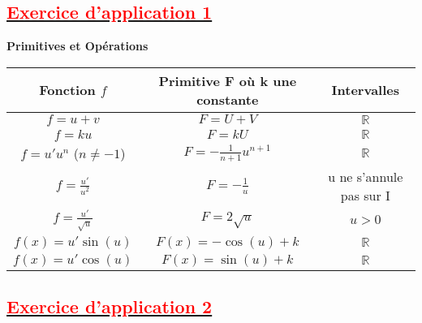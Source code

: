 \documentclass[12pt]{article}
\begin{document}
\subsection*{\underline{\textbf{\textcolor{red}{Exercice d'application 1}}}}
\begin{center}
\textbf{Primitives et Opérations}
\begin{tabular}{|c|c|c|}
\hline
Fonction $f$ & Primitive F où k une constante &Intervalles \\
\hline
$f=u+v$ &$F=U+V$ & $\mathbb{R}$\\
\hline
$f=ku$ & $F=kU$ & $\mathbb{R}$\\
\hline
$f=u'u^{n}$ ($n\neq -1$) & $F=-\frac{1}{n+1}u^{n+1}$ & $\mathbb{R}$\\
\hline
$f=\frac{u'}{u^{2}}$ & $F=-\frac{1}{u}$ & u ne s'annule pas sur I\\
\hline
$f=\frac{u'}{\sqrt{u}}$ & $F=2\sqrt{u}$ & $u>0$\\
\hline
$f(x)=u'\sin(u)$ & $F(x)= -\cos(u)+k$ & $\mathbb{R}$\\
\hline
$f(x)=u'\cos(u)$ & $F(x)= \sin(u)+k$ & $\mathbb{R}$\\
\hline
\end{tabular}
\end{center}
\subsection*{\underline{\textbf{\textcolor{red}{Exercice d'application 2}}}}
\end{document}
